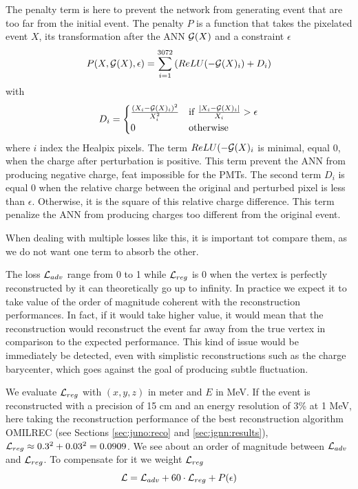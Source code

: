 \documentclass[../main.tex]{subfiles}
\begin{document}
The penalty term is here to prevent the network from generating event that are too far from the initial event. The penalty $P$ is a function that takes the pixelated event $X$, its transformation after the ANN ${\cal G}(X)$ and a constraint $\epsilon$
\begin{equation}
  P(X, {\cal G}(X), \epsilon) = \sum_{i=1}^{3072} \left( ReLU(-{\cal G}(X)_i) + D_i \right)
\end{equation}
with
\begin{equation}
  D_i = \begin{cases}
    \frac{(X_i - {\cal G}(X)_i)^2}{X_i^2}& \text{if } \frac{|X_i - {\cal G}(X)_i|}{X_i} > \epsilon \\
    0& \text{otherwise}
  \end{cases}
\end{equation}
where $i$ index the Healpix pixels. The term $ReLU(-{\cal G}(X)_i$ is minimal, equal 0, when the charge after perturbation is positive. This term prevent the ANN from producing negative charge, feat impossible for the PMTs. The second term $D_i$ is equal 0 when the relative charge between the original and perturbed pixel is less than $\epsilon$. Otherwise, it is the square of this relative charge difference. This term penalize the ANN from producing charges too different from the original event.
\hfill

When dealing with multiple losses like this, it is important tot compare them, as we do not want one term to absorb the other.

The loss ${\cal L}_{adv}$ range from 0 to 1 while ${\cal L}_{reg}$ is 0 when the vertex is perfectly reconstructed by it can theoretically go up to infinity. In practice we expect it to take value of the order of magnitude coherent with the reconstruction performances. In fact, if it would take higher value, it would mean that the reconstruction would reconstruct the event far away from the true vertex in comparison to the expected performance. This kind of issue would be immediately be detected, even with simplistic reconstructions such as the charge barycenter, which goes against the goal of producing subtle fluctuation.

We evaluate ${\cal L}_{reg}$ with $(x, y, z)$ in meter and $E$ in MeV. If the event is reconstructed with a precision of 15 cm and an energy resolution of 3\% at 1 MeV, here taking the reconstruction performance of the best reconstruction algorithm OMILREC (see Sections \ref{sec:juno:reco} and \ref{sec:jgnn:results}), ${\cal L}_{reg} \approx 0.3^2 + 0.03^2 = 0.0909$. We see about an order of magnitude between ${\cal L}_{adv}$ and ${\cal L}_{reg}$. To compensate for it we weight ${\cal L}_{reg}$
\begin{equation}
  {\cal L} = {\cal L}_{adv} + 60\cdot{\cal L}_{reg} + P(\epsilon)
\end{equation}
\end{document}
